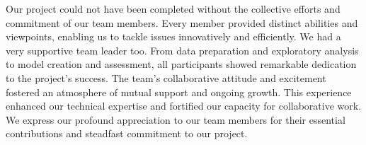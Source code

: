 Our project could not have been completed without the collective efforts and commitment of our team members. Every member provided distinct abilities and viewpoints, enabling us to tackle issues innovatively and efficiently. We had a very supportive team leader too. From data preparation and exploratory analysis to model creation and assessment, all participants showed remarkable dedication to the project's success.
The team's collaborative attitude and excitement fostered an atmosphere of mutual support and ongoing growth. This experience enhanced our technical expertise and fortified our capacity for collaborative work. We express our profound appreciation to our team members for their essential contributions and steadfast commitment to our project.
